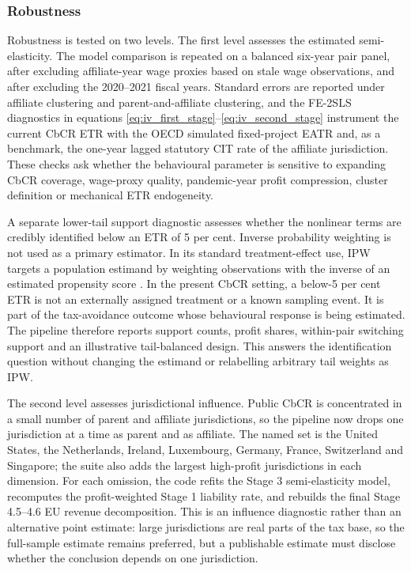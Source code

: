 \documentclass[11pt,a4paper]{article}
\begin{document}
\subsubsection{Robustness}\label{sec:estimation_robustness}
Robustness is tested on two levels. The first level assesses the estimated semi-elasticity. The model comparison is repeated on a balanced six-year pair panel, after excluding affiliate-year wage proxies based on stale wage observations, and after excluding the 2020--2021 fiscal years. Standard errors are reported under affiliate clustering and parent-and-affiliate clustering, and the FE-2SLS diagnostics in equations \eqref{eq:iv_first_stage}--\eqref{eq:iv_second_stage} instrument the current CbCR ETR with the OECD simulated fixed-project EATR and, as a benchmark, the one-year lagged statutory CIT rate of the affiliate jurisdiction. These checks ask whether the behavioural parameter is sensitive to expanding CbCR coverage, wage-proxy quality, pandemic-year profit compression, cluster definition or mechanical ETR endogeneity.

A separate lower-tail support diagnostic assesses whether the nonlinear terms are credibly identified below an ETR of 5 per cent. Inverse probability weighting is not used as a primary estimator. In its standard treatment-effect use, IPW targets a population estimand by weighting observations with the inverse of an estimated propensity score \citep{hirano2003}. In the present CbCR setting, a below-5 per cent ETR is not an externally assigned treatment or a known sampling event. It is part of the tax-avoidance outcome whose behavioural response is being estimated. The pipeline therefore reports support counts, profit shares, within-pair switching support and an illustrative tail-balanced design. This answers the identification question without changing the estimand or relabelling arbitrary tail weights as IPW.

The second level assesses jurisdictional influence. Public CbCR is concentrated in a small number of parent and affiliate jurisdictions, so the pipeline now drops one jurisdiction at a time as parent and as affiliate. The named set is the United States, the Netherlands, Ireland, Luxembourg, Germany, France, Switzerland and Singapore; the suite also adds the largest high-profit jurisdictions in each dimension. For each omission, the code refits the Stage 3 semi-elasticity model, recomputes the profit-weighted Stage 1 liability rate, and rebuilds the final Stage 4.5--4.6 EU revenue decomposition. This is an influence diagnostic rather than an alternative point estimate: large jurisdictions are real parts of the tax base, so the full-sample estimate remains preferred, but a publishable estimate must disclose whether the conclusion depends on one jurisdiction.
\end{document}
